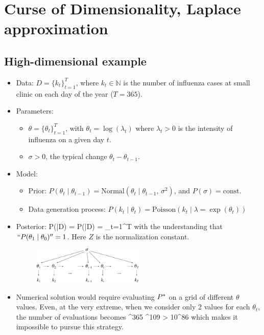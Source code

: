 \section{Curse of Dimensionality, Laplace approximation}


\subsection{High-dimensional example}
\begin{itemize}
	\item Data: $D = \{k_t\}_{t=1}^T$, where $k_t\in\mathds{N}$ is the number of influenza cases at small clinic on each day of the year ($T = 365$).
	\item Parameters: 
	\begin{itemize}
		\item $\theta = \{\theta_t\}_{t=1}^T$, with $\theta_t = \log(\lambda_t)$ where $\lambda_t > 0$ is the intensity of influenza on a given day $t$.
		\item $\sigma > 0$, the typical change $\theta_t - \theta_{t-1}$. 
	\end{itemize}
	\item Model:
	\begin{itemize}
		\item Prior: $P(\theta_t\;|\;\theta_{t-1}) = \text{Normal}(\theta_t\;|\;\theta_{t-1}, \,\sigma^2)$, and $P(\sigma) = \text{const.}$
		\item Data generation process: $P(k_t\;|\;\theta_t) = \text{Poisson}(k_t\;|\; \lambda = \exp(\theta_t))$
	\end{itemize}
	\item Posterior: 
	\be
		P(\theta\;|\;D) =  P\s(\theta\;|\;D) =  \prod_{t=1}^T 
	\ee
	with the understanding that $``P(\theta_1\;|\;\theta_0)'' = 1$.
	Here $Z$ is the normalization constant.
	\begin{figure}[h]
	\centering
		\includegraphics[width=0.5\textwidth]{./figs/06-influenza.pdf}
	\end{figure}
	\item Numerical solution would require evaluating $P^\ast$ on a grid of different $\theta$ values. Even, at the very extreme, when we consider only 2 values for each $\theta_t$, the number of evaluations becomes
	^{365} ^{109} > 10^{86} 
	\ee
	which makes it impossible to pursue this strategy.
\end{itemize}

